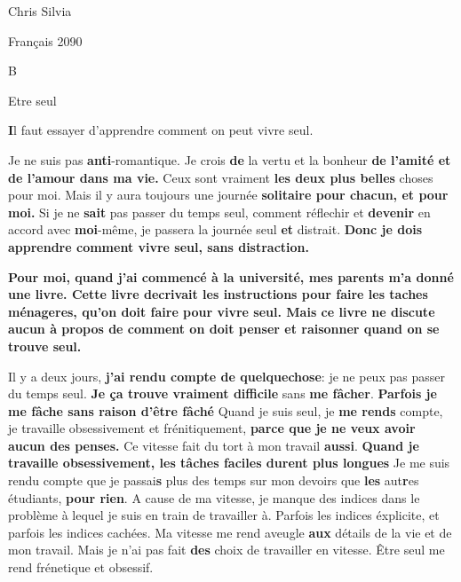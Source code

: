 \documentclass{article}
\newcommand{\bo}[1]{\textbf{#1}}
\begin{document}
\begin{flushright}
Chris Silvia

Français 2090


B

\end{flushright}

\begin{centering}

Etre seul

\end{centering}

\begin{doublespace}

\bo{I}l faut essayer d'apprendre
	comment on peut vivre seul.

Je ne suis pas \bo{anti}-romantique.
Je crois \bo{de} la vertu et la bonheur \bo{de l'amité et de l'amour dans ma vie.}
Ceux sont vraiment \bo{les deux plus belles} choses pour moi.
Mais il y aura toujours une journée \bo{solitaire pour chacun, et pour moi.}
Si je ne \bo{sait} pas passer du temps seul, comment réflechir
	et \bo{devenir} en accord avec \bo{moi}-même, je passera la journée seul
	\bo{et} distrait.
\bo{Donc je dois apprendre comment vivre seul, sans distraction.}

\bo{Pour moi, quand j'ai commencé à la université, mes parents
	m'a donné une livre.
Cette livre decrivait les instructions pour faire les taches
	ménageres, qu'on doit faire pour vivre seul.
Mais ce livre ne discute aucun à propos de comment on doit
	penser et raisonner quand on se trouve seul.}

Il y a deux jours, \bo{j'ai rendu compte de quelquechose}: 
	je ne peux pas passer du temps seul.
\bo{Je ça trouve vraiment difficile} sans \bo{me fâcher}.
\bo{Parfois je me fâche sans raison d'être fâché}
Quand je suis seul, je \bo{me rends} compte, je travaille obsessivement
	et frénitiquement, \bo{parce que je ne veux avoir aucun des penses.}
Ce vitesse fait du tort à mon travail \bo{aussi}.
\bo{Quand je travaille obsessivement, les tâches faciles durent
	plus longues}
Je me suis rendu compte que je passai\bo{s} plus des temps sur mon devoirs
	que \bo{les} aut\bo{r}es étudiants, \bo{pour rien}.
A cause de ma vitesse, je manque des indices dans le problème à lequel
	je suis en train de travailler à.
Parfois les indices éxplicite, et parfois les indices cachées.
Ma vitesse me rend aveugle \bo{aux} détails de la vie et de mon travail.
Mais je n'ai pas fait \bo{des} choix de travailler en vitesse.
Être seul me rend frénetique et obsessif.


\end{doublespace}
\end{document}
